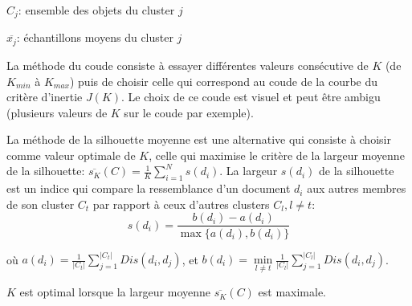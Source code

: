 $C_j$: ensemble des objets du cluster $j$

$\overline{x_j}$: échantillons moyens du cluster $j$

La méthode du coude consiste à essayer différentes valeurs consécutive de $K$ (de $K_{min}$ à $K_{max}$) puis de choisir celle qui correspond au coude de la courbe du critère d'inertie $J(K)$. Le choix de ce coude est visuel et peut être ambigu (plusieurs valeurs de $K$ sur le coude par exemple). 

La méthode de la silhouette moyenne \citep{rousseeuw1987silhouetteclusternumber} est une alternative qui consiste à choisir comme valeur optimale de $K$, celle qui maximise le critère de la largeur moyenne de la silhouette: $\overline{s_K}(C) = \frac{1}{K}\sum\limits_{i=1}^N s(d_i)$. La largeur $s(d_i)$ de la silhouette est un indice qui compare la ressemblance d'un document $d_i$ aux autres membres de son cluster $C_t$ par rapport à ceux d'autres clusters $C_l, l \neq t$:
\[s(d_i) = \frac{b(d_i) - a(d_i)}{\max\lbrace a(d_i),b(d_i)\rbrace}\]

où $a(d_i) = \frac{1}{\vert C_t \vert} \sum\limits_{j=1}^{\vert C_t \vert} Dis(d_i, d_j)$, et $b(d_i) = \min\limits_{l \neq t} \frac{1}{\vert C_l \vert} \sum\limits_{j=1}^{\vert C_l \vert} Dis(d_i, d_j)$.

$K$ est optimal lorsque la largeur moyenne $\overline{s_K}(C)$ est maximale. %




